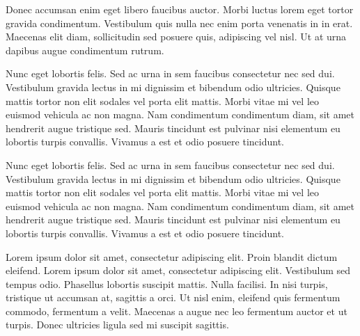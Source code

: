 \documentclass{carver-cyberlaw}
\begin{document}
Donec accumsan enim eget libero faucibus auctor. Morbi luctus lorem eget 
tortor gravida condimentum. Vestibulum quis nulla nec enim porta venenatis in 
in erat. Maecenas elit diam, sollicitudin sed posuere quis, adipiscing vel 
nisl. Ut at urna dapibus augue condimentum rutrum.

Nunc eget lobortis felis. Sed ac urna in sem faucibus consectetur nec sed dui. 
Vestibulum gravida lectus in mi dignissim et bibendum odio ultricies. Quisque 
mattis tortor non elit sodales vel porta elit mattis. Morbi vitae mi vel leo 
euismod vehicula ac non magna. Nam condimentum condimentum diam, sit amet 
hendrerit augue tristique sed. Mauris tincidunt est pulvinar nisi elementum eu 
lobortis turpis convallis. Vivamus a est et odio posuere tincidunt.

Nunc eget lobortis felis. Sed ac urna in sem faucibus consectetur nec sed dui. 
Vestibulum gravida lectus in mi dignissim et bibendum odio ultricies. Quisque 
mattis tortor non elit sodales vel porta elit mattis. Morbi vitae mi vel leo 
euismod vehicula ac non magna. Nam condimentum condimentum diam, sit amet 
hendrerit augue tristique sed. Mauris tincidunt est pulvinar nisi elementum eu 
lobortis turpis convallis. Vivamus a est et odio posuere tincidunt.

Lorem ipsum dolor sit amet, consectetur adipiscing elit. Proin blandit dictum 
eleifend. Lorem ipsum dolor sit amet, consectetur adipiscing elit. Vestibulum 
sed tempus odio. Phasellus lobortis suscipit mattis. Nulla facilisi. In nisi 
turpis, tristique ut accumsan at, sagittis a orci. Ut nisl enim, eleifend quis 
fermentum commodo, fermentum a velit. Maecenas a augue nec leo fermentum 
auctor et ut turpis. Donec ultricies ligula sed mi suscipit sagittis.
\end{document}
